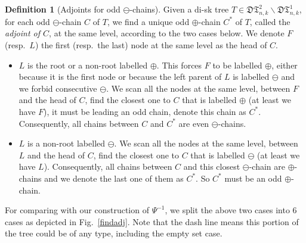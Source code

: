 \documentclass[12pt]{amsart}
\numberwithin{equation}{section}
\theoremstyle{plain}
\theoremstyle{definition}
\newtheorem{Def}[theorem]{Definition}
\def\D{\mathfrak{D}}
\def\T{\mathfrak{T}}
\begin{document}
\begin{Def}[Adjoints for odd $\ominus$-chains]\label{adjoint}
Given a di-sk tree $T\in \D\T^{2}_{n,k}\backslash \D\T^{1}_{n,k}$, for each odd $\ominus$-chain $C$ of $T$, we find a unique odd $\oplus$-chain $C^{*}$ of $T$, called the {\em adjoint of $C$}, at the same level, according to the two cases below. We denote $F$ (resp.~$L$) the first (resp.~the last) node at the same level as the head of $C$.
\begin{itemize}
\item[Case I:] $L$ is the root or a non-root labelled $\oplus$. This forces $F$ to be labelled $\oplus$, either because it is the first node or because the left parent of $L$ is labelled $\ominus$ and we forbid consecutive $\ominus$. We scan all the nodes at the same level, between $F$ and the head of $C$, find the closest one to $C$ that is labelled $\oplus$ (at least we have $F$), it must be leading an odd chain, denote this chain as $C^{*}$. Consequently, all chains between $C$ and $C^{*}$ are even $\ominus$-chains. 
\item[Case II:] $L$ is a non-root labelled $\ominus$. We scan all the nodes at the same level, between $L$ and the head of $C$, find the closest one to $C$ that is labelled $\ominus$ (at least we have $L$). Consequently, all chains between $C$ and this closest $\ominus$-chain are $\oplus$-chains and we denote the last one of them as $C^{*}$. So $C^{*}$ must be an odd $\oplus$-chain. 
\end{itemize}
\end{Def}

For comparing with our construction of $\Psi^{-1}$, we split the above two cases into  $6$ cases as depicted in Fig.~\ref{findadj}. Note that the dash line means this portion of the tree could be of any type, including the empty set case.
\end{document}

